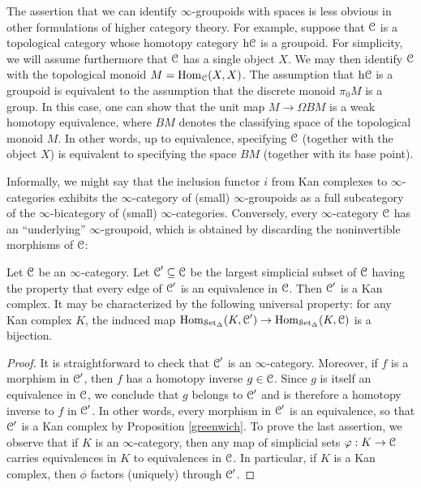 \begin{1.2.5 inf-gpoids and classical homotopy}
\begin{remark}
The assertion that we can identify $\infty$-groupoids with spaces is less obvious in other formulations of higher category theory. For example, suppose that $\operatorname{\mathcal{C}}$ is a topological category whose homotopy category $\rm{h} \it{\operatorname{\mathcal{C}}}$ is a groupoid. For simplicity, we will assume furthermore that $\operatorname{\mathcal{C}}$ has a single object $X$. We may then identify $\operatorname{\mathcal{C}}$ with
the topological monoid $M=\operatorname{Hom}_{\operatorname{\mathcal{C}}}(X,X)$. The assumption that
$\rm{h} \it{ \operatorname{\mathcal{C}}}$ is a groupoid is equivalent to the assumption
that the discrete monoid $\pi_0 M$ is a group. In this case, one can show that the 
unit map $M \rightarrow \Omega BM$ is a weak homotopy
equivalence, where $BM$ denotes the classifying space of the
topological monoid $M$. In other words, up to equivalence,
specifying $\operatorname{\mathcal{C}}$ (together with the object $X$) is equivalent to
specifying the space $BM$ (together with its base point).
\end{remark}

Informally, we might say that the inclusion functor $i$ from Kan
complexes to $\infty$-categories exhibits the $\infty$-category of
(small) $\infty$-groupoids as a full subcategory of
the $\infty$-bicategory of (small) $\infty$-categories. Conversely, every
$\infty$-category $\operatorname{\mathcal{C}}$ has an ``underlying'' $\infty$-groupoid, which is obtained by discarding the noninvertible morphisms of $\operatorname{\mathcal{C}}$:

\begin{proposition}\label{lumba}
Let $\operatorname{\mathcal{C}}$ be an $\infty$-category. Let $\operatorname{\mathcal{C}}' \subseteq \operatorname{\mathcal{C}}$ be the largest simplicial
subset of $\operatorname{\mathcal{C}}$ having the property that every edge of $\operatorname{\mathcal{C}}'$ is an equivalence in $\operatorname{\mathcal{C}}$.
Then $\operatorname{\mathcal{C}}'$ is a Kan complex. It may be characterized by the
following universal property: for any Kan complex $K$, the induced
map $\operatorname{Hom}_{\operatorname{\mathcal{S}et_{\Delta}}}(K,\operatorname{\mathcal{C}}') \rightarrow \operatorname{Hom}_{\operatorname{\mathcal{S}et_{\Delta}}}(K,\operatorname{\mathcal{C}})$ is a
bijection.
\end{proposition}

\begin{proof}
It is straightforward to check that $\operatorname{\mathcal{C}}'$ is an $\infty$-category. Moreover, if
$f$ is a morphism in $\operatorname{\mathcal{C}}'$, then $f$ has a homotopy inverse $g \in \operatorname{\mathcal{C}}$. Since
$g$ is itself an equivalence in $\operatorname{\mathcal{C}}$, we conclude that $g$ belongs to $\operatorname{\mathcal{C}}'$ and
is therefore a homotopy inverse to $f$ in $\operatorname{\mathcal{C}}'$. In other words, every morphism in $\operatorname{\mathcal{C}}'$ is an equivalence, so that $\operatorname{\mathcal{C}}'$ is a Kan complex by Proposition \ref{greenwich}. To prove the last assertion, we observe that if $K$ is an $\infty$-category, then any map of simplicial sets
$\varphi: K \rightarrow \operatorname{\mathcal{C}}$ carries equivalences in $K$ to equivalences in $\operatorname{\mathcal{C}}$. In particular, if
$K$ is a Kan complex, then $\phi$ factors (uniquely) through $\operatorname{\mathcal{C}}'$.
\end{proof}


\end{1.2.5 inf-gpoids and classical homotopy}
